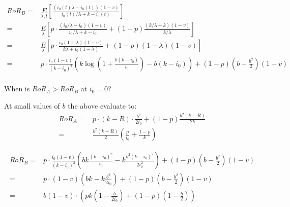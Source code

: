 \begin{align*}
RoR_B =& \underset{\lambda, t}E\left[\frac{(i_0(t)\lambda - i_0(t))(1-v)}{i_0(t)/\lambda + k - i_0(t)}\right]\\
                                     =& \underset{\lambda}E\left[p\cdot\frac{(i_0/\lambda - i_0)(1-v)}{i_0/\lambda + k - i_0} + (1-p)\frac{(k/\lambda - k)(1-v)}{k/\lambda}\right]\\
                                     =& \underset{\lambda}E\left[p\cdot\frac{i_0(1-\lambda)(1-v)}{k\lambda + i_0(1-\lambda)} + (1-p)(1-\lambda)(1-v)\right]\\
                                     =& p\cdot\frac{i_0(1-v)}{(k-i_0)^2}\left(k\log\left(1+\frac{b(k-i_0)}{i_0}\right) - b(k-i_0)\right) + (1-p)(b-\frac{b^2}{2})(1-v)\\
\end{align*}

{\arpit
\begin{theorem}
When is $RoR_A > RoR_B$ at $i_0 = 0$?
\end{theorem}
}

At small values of $b$ the above evaluate to:
\begin{align*}
RoR_A =& p\cdot(k-R)\cdot\frac{b^2}{2i_0} + (1-p)\frac{b^2(k-R)}{2k}\\
                                       =& \frac{b^2(k-R)}{2}\left(\frac{p}{i_0} + \frac{1-p}{k}\right)
\end{align*}

\begin{align*}
RoR_B =& p\cdot\frac{i_0(1-v)}{(k-i_0)^2}\left(bk\frac{(k-i_0)^2}{i_0}- k\frac{b^2(k-i_0)^2}{2i_0^2} \right) + (1-p)(b-\frac{b^2}{2})(1-v)\\
                                     =& p\cdot(1-v)\left(bk- k\frac{b^2}{2i_0}\right) + (1-p)(b-\frac{b^2}{2})(1-v)\\
                                     =& b(1-v)\cdot \left(pk(1-\frac{b}{2i_0}) + (1-p)(1-\frac{b}{2})\right)
\end{align*}

